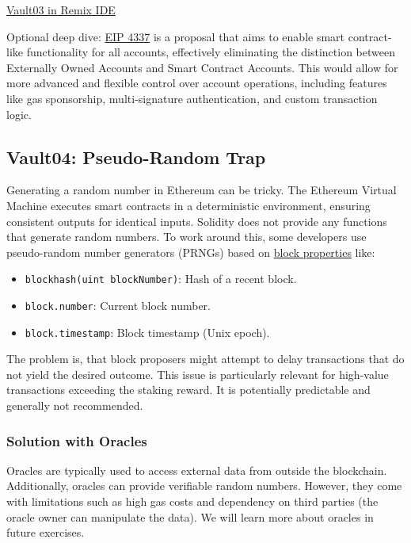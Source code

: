 \documentclass[12pt]{article}
\begin{document}
\medskip
\noindent
\href{https://remix.ethereum.org/?#activate=solidity&url=https://github.com/radovluk/unbreakable-vault/contracts/Vault03.sol&lang=en&optimize=false&runs=200&evmVersion=null&version=soljson-v0.8.28+commit.7893614a.js}{Vault03 in Remix IDE}

\medskip
\noindent
Optional deep dive:
\href{https://eips.ethereum.org/EIPS/eip-4337}{EIP 4337} is a proposal that aims to enable smart contract-like functionality for all accounts, effectively eliminating the distinction between Externally Owned Accounts and Smart Contract Accounts. This would allow for more advanced and flexible control over account operations, including features like gas sponsorship, multi-signature authentication, and custom transaction logic.

\subsection*{Vault04: Pseudo-Random Trap}

Generating a random number in Ethereum can be tricky. The Ethereum Virtual
Machine executes smart contracts in a deterministic environment, ensuring
consistent outputs for identical inputs. Solidity does not provide any
functions that generate random numbers. To work around this, some developers
use pseudo-random number generators (PRNGs) based on
\href{https://docs.soliditylang.org/en/latest/cheatsheet.html\#block-and-transaction-properties}{block
    properties} like:

\begin{itemize}
    \item \texttt{blockhash(uint blockNumber)}: Hash of a recent block.
    \item \texttt{block.number}: Current block number.
    \item \texttt{block.timestamp}: Block timestamp (Unix epoch).
\end{itemize}

\noindent
The problem is, that block proposers might attempt to delay transactions that do not yield the desired outcome. This issue is particularly relevant for high-value transactions exceeding the staking reward. It is potentially predictable and generally not recommended.

\subsubsection*{Solution with Oracles} Oracles are typically used to access external data from outside the blockchain. Additionally, oracles can provide verifiable random numbers. However, they come with limitations such as high gas costs and dependency on third parties (the oracle owner can manipulate the data). We will learn more about oracles in future exercises.
\end{document}
